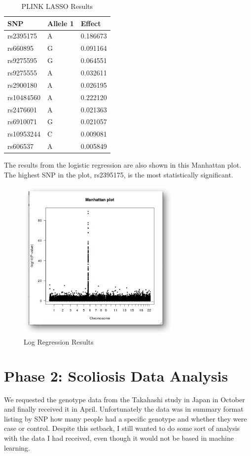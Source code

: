 \documentclass[12pt]{report}
\begin{document}
\begin{table}[ht]
\centering
\caption{PLINK LASSO Results}
\label{Table 2}
\begin{tabular}{@{}lll@{}}
\toprule
SNP        & Allele 1 & Effect   \\ \midrule
\cellcolor{PaleTurquoise2}rs2395175  & A        & 0.186673 \\
rs660895   & G        & 0.091164 \\
rs9275595  & G        & 0.064551 \\
rs9275555  & A        & 0.032611 \\
rs2900180  & A        & 0.026195 \\
rs10484560 & A        & 0.222120 \\
\cellcolor{PaleGreen2}rs2476601  & A        & 0.021363 \\
rs6910071  & G        & 0.021057 \\
rs10953244 & C        & 0.009081 \\
rs606537   & A        & 0.005849 \\ \bottomrule
\end{tabular}
\end{table}

The results from the logistic regression are also shown in this Manhattan plot.
The highest SNP in the plot, rs2395175, is the most statistically significant.

\begin{figure}[H]
    \caption{Log Regression Results}
\label{Figure 1}
    \includegraphics[width=8cm]{figure_1}
    \centering
\end{figure}


\section{Phase 2: Scoliosis Data Analysis}
We requested the genotype data from the Takahashi study in Japan in October and
finally received it in April. Unfortunately the data was in summary format listing
by SNP how many people had a specific genotype and whether they were case or control.
Despite this setback, I still wanted to do some sort of analysis with the data I
had received, even though it would not be based in machine learning.
\end{document}
